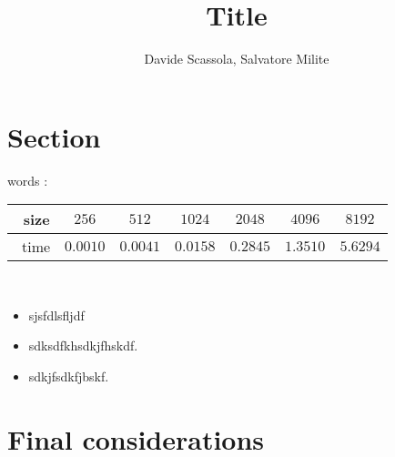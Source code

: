 \documentclass[a4paper,11pt]{article}
\title{Title}
\author{Davide Scassola, Salvatore Milite}
\begin{document}
\maketitle


\section*{Section}
words :\\

\begin{tabular}{|c|c|c|c|c|c|c|}
\hline
\ size   & $256$ & $512$ & $1024$ & $2048$ & $4096$ & $8192$   \\
\hline
\ time & $0.0010$ & $0.0041$ & $0.0158$ & $0.2845$ & $1.3510$ & $5.6294$ \\
\hline
\end{tabular}\\

\begin{itemize}
\item sjsfdlsfljdf

\item sdksdfkhsdkjfhskdf.

\item sdkjfsdkfjbskf.
\end{itemize}




\section*{Final considerations}



\vspace{2cm}
\end{document}
